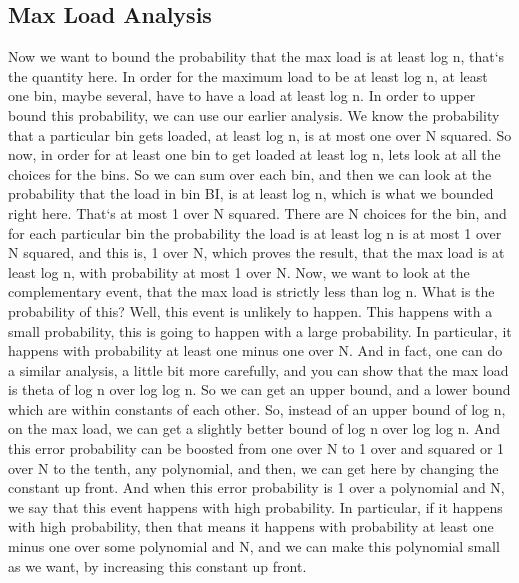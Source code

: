 \subsection{Max Load Analysis}
Now we want to bound the probability that the max load is at least log n, that`s the quantity here.
In order for the maximum load to be at least log n, at least one bin, maybe several, have to have a load at least log n.
In order to upper bound this probability, we can use our earlier analysis.
We know the probability that a particular bin gets loaded, at least log n, is at most one over N squared.
So now, in order for at least one bin to get loaded at least log n, lets look at all the choices for the bins.
So we can sum over each bin, and then we can look at the probability that the load in bin BI, is at least log n, which is what we bounded right here.
That`s at most 1 over N squared.
There are N choices for the bin, and for each particular bin the probability the load is at least log n is at most 1 over N squared, and this is, 1 over N, which proves the result, that the max load is at least log n, with probability at most 1 over N\@.
Now, we want to look at the complementary event, that the max load is strictly less than log n.
What is the probability of this? Well, this event is unlikely to happen.
This happens with a small probability, this is going to happen with a large probability.
In particular, it happens with probability at least one minus one over N\@.
And in fact, one can do a similar analysis, a little bit more carefully, and you can show that the max load is theta of log n over log log n.
So we can get an upper bound, and a lower bound which are within constants of each other.
So, instead of an upper bound of log n, on the max load, we can get a slightly better bound of log n over log log n.
And this error probability can be boosted from one over N to 1 over and squared or 1 over N to the tenth, any polynomial, and then, we can get here by changing the constant up front.
And when this error probability is 1 over a polynomial and N, we say that this event happens with high probability.
In particular, if it happens with high probability, then that means it happens with probability at least one minus one over some polynomial and N, and we can make this polynomial small as we want, by increasing this constant up front.

